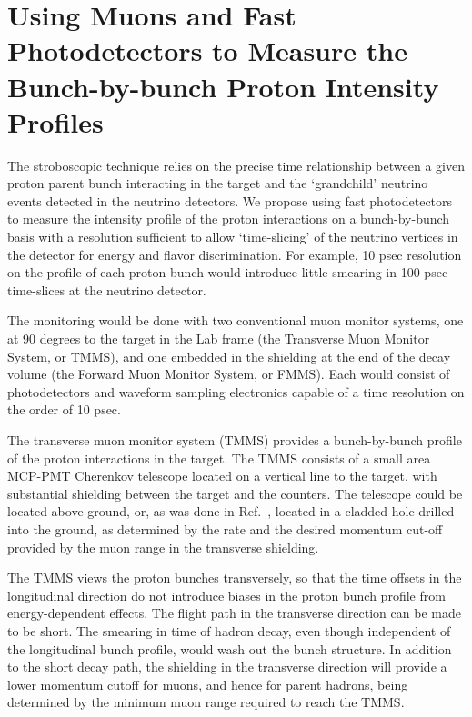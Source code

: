 
%
\section{Using Muons and Fast Photodetectors to Measure the Bunch-by-bunch Proton Intensity Profiles}
\label{muon_monitor}

The stroboscopic technique relies on the precise time relationship
between a given proton parent bunch interacting in the target and the `grandchild' neutrino
events detected in the neutrino detectors. We propose using fast
photodetectors to measure the intensity profile of the proton
interactions on a bunch-by-bunch basis with a resolution sufficient to
allow `time-slicing' of the neutrino vertices in the detector for
energy and flavor discrimination. For example, 10 psec resolution
on the profile of each proton bunch would introduce little smearing in 100 psec
time-slices at the neutrino detector.


The monitoring would be done with two conventional muon monitor
systems, one at 90 degrees to the target in the Lab frame (the
Transverse Muon Monitor System, or TMMS), and one
embedded in the shielding at the end of the decay volume (the Forward
Muon Monitor System, or FMMS). Each would
consist of photodetectors and waveform sampling electronics capable of a
time resolution on the order of 10 psec.


The transverse muon monitor system (TMMS) provides a bunch-by-bunch
profile of the proton interactions in the target. The TMMS consists of
a small area MCP-PMT Cherenkov telescope located on a vertical line to
the target, with substantial shielding between the target and the
counters. The telescope could be located above ground, or, as was done
in Ref.~\cite{E100}, located in a cladded hole drilled into the
ground, as determined by the rate and the desired momentum cut-off
provided by the muon range in the transverse shielding.

The TMMS views the proton bunches transversely, so that the time
offsets in the longitudinal direction do not introduce biases in the
proton bunch profile from energy-dependent effects. The flight path in
the transverse direction can be made to be short. The smearing in time of
hadron decay, even though independent of the longitudinal bunch
profile, would wash out the bunch structure. In addition to the short
decay path, the shielding in the
transverse direction will provide a lower momentum cutoff for muons, and
hence for parent hadrons, being determined by the minimum muon range
required to reach the TMMS.

